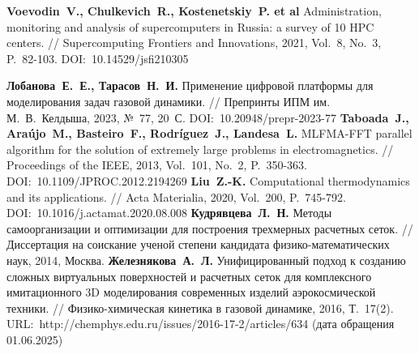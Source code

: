 \begin{thebibliography}{99}



\textbf{Voevodin~V., Chulkevich~R., Kostenetskiy~P. et al} Administration, monitoring and analysis of supercomputers
in Russia: a survey of 10 HPC centers. // Supercomputing Frontiers and Innovations, 2021, Vol.~8, No.~3, P.~82-103. DOI:~10.14529/jsfi210305
%



%
\textbf{Лобанова~Е.~Е., Тарасов~Н.~И.} Применение цифровой платформы для моделирования задач газовой динамики. // Препринты ИПМ им. М.~В.~Келдыша, 2023, №~77, 20~С. DOI:~10.20948/prepr-2023-77
%
\textbf{Taboada~J., Ara{\'u}jo~M., Basteiro~F., Rodr{\'i}guez~J., Landesa~L.} MLFMA-FFT parallel algorithm for the solution of extremely large problems in electromagnetics. // Proceedings of the IEEE, 2013, Vol.~101, No.~2, P.~350-363. DOI:~10.1109/JPROC.2012.2194269
%
\textbf{Liu~Z.-K.} Computational thermodynamics and its applications. // Acta Materialia, 2020, Vol.~200, P.~745-792. DOI:~10.1016/j.actamat.2020.08.008
%
\textbf{Кудрявцева~Л.~Н.} Методы самоорганизации и оптимизации для построения трехмерных расчетных сеток. // Диссертация на соискание ученой степени кандидата физико-математических наук, 2014, Москва.
%
\textbf{Железнякова~А.~Л.} Унифицированный подход к созданию сложных виртуальных поверхностей и расчетных сеток для комплексного имитационного 3D моделирования современных изделий аэрокосмической техники. // Физико-химическая кинетика в газовой динамике, 2016, Т.~17(2). URL:~http://chemphys.edu.ru/issues/2016-17-2/articles/634 (дата обращения 01.06.2025)
%




\end{thebibliography}
